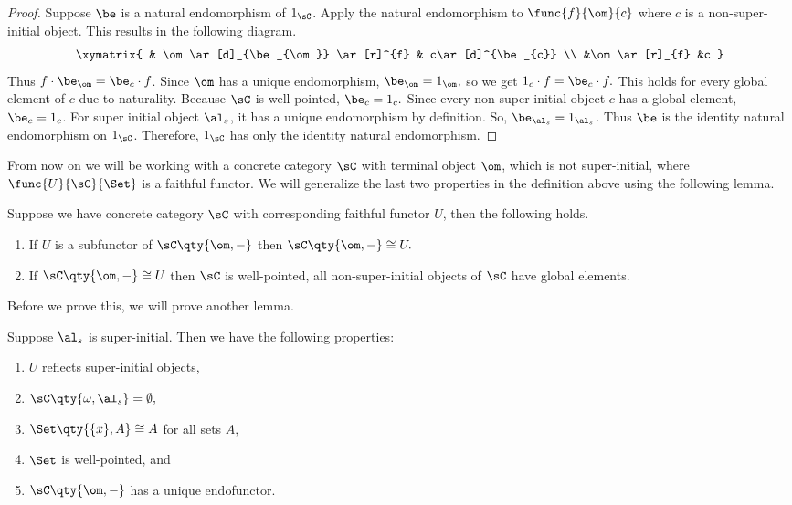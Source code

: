 \documentclass[main.tex]{subfiles}
\begin{document}
\begin{proof}
	
	Suppose $\be$ is a natural endomorphism of $1_{\sC}$. Apply the natural 
	endomorphism to $\func{f}{\om}{c}$ where $c$ is a non-super-initial object. 
	This results in the following diagram. 
	$$\xymatrix{ & \om \ar[d]_{\be_{\om}} 
	\ar[r]^{f} & c\ar[d]^{\be_{c}}  \\   &\om \ar[r]_{f} &c  } 
	$$ 
	Thus $f \cdot \be_{\om} = \be_{c} \cdot f$.
	Since $\om$ has a unique endomorphism, $\be_{\om} = 1_{\om},$ so we get 
	$1_{c} \cdot f  = \be_{c} \cdot f.$ This holds for every global element of 
	$c$ due to naturality. Because 
	$\sC$ is well-pointed, $\be_{c} = 1_{c}.$ Since every non-super-initial 
	object $c$ has a global element, $\be_{c} = 1_{c}$. For super initial 
	object $\al_{s}$, it has a unique endomorphism by definition. So, 
	$\be_{\al_{s}} = 1_{\al_{s}}$. Thus $\be$ is the identity natural 
	endomorphism on $1_{\sC}$. Therefore, $1_{\sC}$ has only the identity 
	natural endomorphism.
	
\end{proof}

From now on we will be working with a concrete category $\sC$ with terminal 
object $\om$, which is not super-initial, where $\func{U}{\sC}{\Set}$ is a 
faithful functor. We will generalize the last two properties in the definition 
above using the following lemma.

\begin{lemma}
	
	Suppose we have concrete category $\sC$ with corresponding faithful functor $U$, then the following holds.

	\begin{enumerate}
		
		\item If $U$ is a subfunctor of $\sC\qty{\om,-}$ then $\sC\qty{\om,-} \cong U.$
		\item If $\sC\qty{\om,-} \cong U$ then $\sC$ is well-pointed, all non-super-initial objects of $\sC$ have global elements.
		
	\end{enumerate}
	
	 
	
\end{lemma}

Before we prove this, we will prove another lemma.

\begin{lemma}
	
	Suppose $\al_{s}$ is super-initial. Then we have the following properties:
	
	\begin{enumerate}
		\item $U$ reflects super-initial objects,
		\item $\sC\qty{\omega,\al_{s}} = \emptyset,$
		\item $\Set\qty{\{x\},A } \cong A$ for all sets $A,$
		\item $\Set$ is well-pointed, and
		\item $\sC\qty{\om,-}$ has a unique endofunctor.
	\end{enumerate}
	
\end{lemma}
\end{document}
